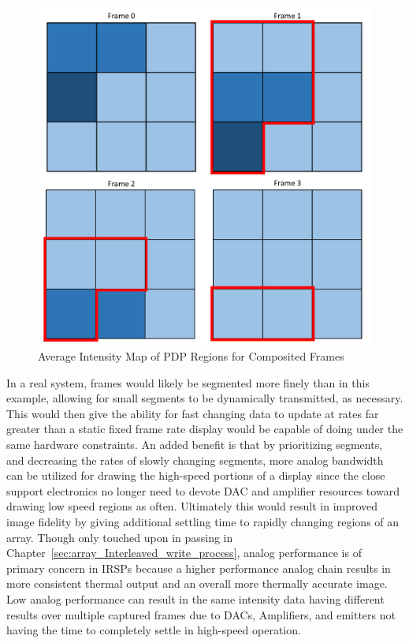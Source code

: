     \begin{figure}
        \centering
        \includegraphics[width=1.0\textwidth]{fig/frames.pdf}
        \caption{Average Intensity Map of PDP Regions for Composited Frames}
        \label{fig:intensity_map}
    \end{figure}

    In a real system, frames would likely be segmented more finely than in this example, allowing for small segments to be dynamically transmitted, as necessary. This would then give the ability for fast changing data to update at rates far greater than a static fixed frame rate display would be capable of doing under the same hardware constraints. An added benefit is that by prioritizing segments, and decreasing the rates of slowly changing segments, more analog bandwidth can be utilized for drawing the high-speed portions of a display since the close support electronics no longer need to devote DAC and amplifier resources toward drawing low speed regions as often. Ultimately this would result in improved image fidelity by giving additional settling time to rapidly changing regions of an array. Though only touched upon in passing in Chapter~\ref{sec:array_Interleaved_write_process}, analog performance is of primary concern in IRSPs because a higher performance analog chain results in more consistent thermal output and an overall more thermally accurate image. Low analog performance can result in the same intensity data having different results over multiple captured frames due to DACs, Amplifiers, and emitters not having the time to completely settle in high-speed operation.
